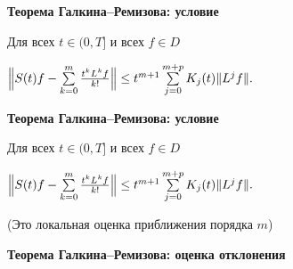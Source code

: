 \documentclass[11pt]{article}
\begin{document}
\newpage

\begin{center}
{\color{notaeYELLOW}\bfseries\fontsize{44}{52}\selectfont Теорема Галкина--Ремизова: условие}
\end{center}
\vspace*{\fill}
\begin{center}
\fontsize{36}{43}\selectfont
\parbox{\linewidth}{\centering\noindent Для всех $t\in(0,T]$ и всех $f\in D$
\par}\vspace{0.4in}
\parbox{\linewidth}{\centering\noindent $\Bigl\|S(t)f-\sum\limits_{k=0}^{m}\frac{t^kL^kf}{k!}\Bigr\|\le t^{m+1}\sum\limits_{j=0}^{m+p}K_j(t)\|L^jf\|.$
\par}\vspace{0.4in}
\end{center}
\vspace*{\fill}

\newpage

\begin{center}
{\color{notaeYELLOW}\bfseries\fontsize{44}{52}\selectfont Теорема Галкина--Ремизова: условие}
\end{center}
\vspace*{\fill}
\begin{center}
\fontsize{36}{43}\selectfont
\parbox{\linewidth}{\centering\noindent Для всех $t\in(0,T]$ и всех $f\in D$
\par}\vspace{0.4in}
\parbox{\linewidth}{\centering\noindent $\Bigl\|S(t)f-\sum\limits_{k=0}^{m}\frac{t^kL^kf}{k!}\Bigr\|\le t^{m+1}\sum\limits_{j=0}^{m+p}K_j(t)\|L^jf\|.$
\par}\vspace{0.4in}
\parbox{\linewidth}{\centering\noindent (Это локальная оценка приближения порядка $m$)
\par}\vspace{0.4in}
\end{center}
\vspace*{\fill}

\newpage

\begin{center}
{\color{notaeYELLOW}\bfseries\fontsize{44}{52}\selectfont Теорема Галкина--Ремизова: оценка отклонения}
\end{center}
\vspace*{\fill}
\begin{center}
\fontsize{36}{43}\selectfont
\end{center}
\vspace*{\fill}
\end{document}
